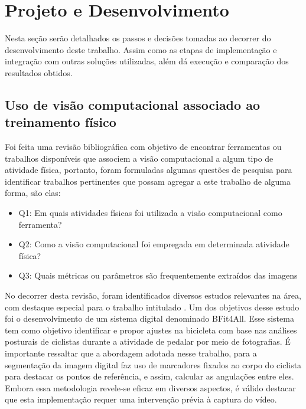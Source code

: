 \chapter{Projeto e Desenvolvimento}
Nesta seção serão detalhados os passos e decisões tomadas ao decorrer do desenvolvimento deste trabalho. Assim como as etapas de implementação e integração com outras soluções utilizadas, além dá execução e comparação dos resultados obtidos.

\section[Uso de visão computacional associado ao treinamento físico]{Uso de visão computacional associado ao treinamento físico}\label{sec:Uso de visao computacional associado ao treinamento fisico}

Foi feita uma revisão bibliográfica com objetivo de encontrar ferramentas ou trabalhos disponíveis que associem a visão computacional a algum tipo de atividade física, portanto, foram formuladas algumas questões de pesquisa para identificar trabalhos pertinentes que possam agregar a este trabalho de alguma forma, são elas:
 \begin{itemize}
   \item Q1: Em quais atividades físicas foi utilizada a visão computacional como ferramenta?
   \item Q2: Como a visão computacional foi empregada em determinada atividade física?
   \item Q3: Quais métricas ou parâmetros são frequentemente extraídos das imagens
 \end{itemize}

No decorrer desta revisão, foram identificados diversos estudos relevantes na área, com destaque especial para o trabalho intitulado  \cite{vcBicicleta}. Um dos objetivos desse estudo foi o desenvolvimento de um sistema digital denominado BFit4All. Esse sistema tem como objetivo identificar e propor ajustes na bicicleta com base nas análises posturais de ciclistas durante a atividade de pedalar por meio de fotografias. É importante ressaltar que a abordagem adotada nesse trabalho, para a segmentação da imagem digital faz uso de marcadores fixados ao corpo do ciclista para destacar os pontos de referência, e assim, calcular as angulações entre eles. Embora essa metodologia revele-se eficaz em diversos aspectos, é válido destacar que esta implementação requer uma intervenção prévia à captura do vídeo.

